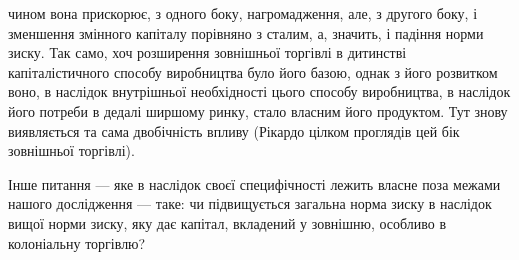 \parcont{}  %
чином вона прискорює, з одного боку, нагромадження, але, з другого боку, і зменшення змінного
капіталу порівняно з сталим, а, значить, і падіння норми зиску. Так само, хоч розширення зовнішньої
торгівлі в дитинстві капіталістичного способу виробництва було його базою, однак з його розвитком
воно, в наслідок внутрішньої необхідності цього способу виробництва, в наслідок його потреби в
дедалі ширшому ринку, стало власним його продуктом. Тут знову виявляється та сама двобічність впливу
(Рікардо цілком проглядів цей бік зовнішньої торгівлі).

Інше питання — яке в наслідок своєї специфічності лежить власне поза межами нашого дослідження —
таке: чи підвищується загальна норма зиску в наслідок вищої норми зиску, яку дає капітал, вкладений
у зовнішню, особливо в колоніальну торгівлю?

